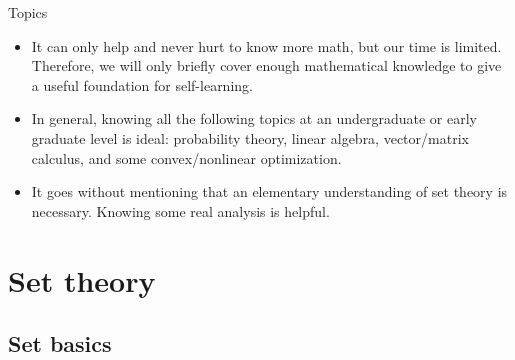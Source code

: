 \documentclass{beamer}
\numberwithin{equation}{section}
\begin{document}
\begin{frame}{Topics}
    \begin{itemize}
        \item
        It can only help and never hurt to know more
        math\footnotemark{}, but our time is
        limited. Therefore, we will only briefly cover enough mathematical
        knowledge to give a useful foundation for self-learning.

        \item
        In general, knowing all the following topics at an undergraduate or
        early graduate level is ideal: probability theory, linear algebra,
        vector/matrix calculus, and some convex/nonlinear optimization.

        \item
        It goes without mentioning that an elementary understanding of set
        theory is necessary. Knowing some real analysis is helpful.
    \end{itemize}
\end{frame}

\section{Set theory}

\subsection{Set basics}
\end{document}
